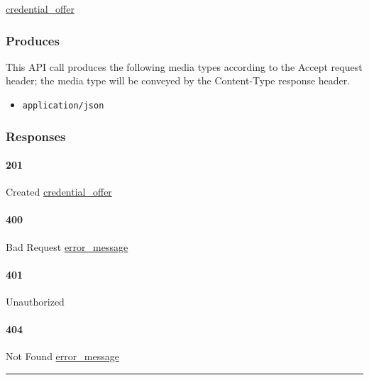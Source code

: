 \protect\hyperlink{credential_offer}{credential\_offer}

\hypertarget{produces-38}{%
\subsubsection{Produces}\label{produces-38}}

This API call produces the following media types according to the
{Accept} request header; the media type will be conveyed by the
{Content-Type} response header.

\begin{itemize}
\tightlist
\item
  \texttt{application/json}
\end{itemize}

\hypertarget{responses-38}{%
\subsubsection{Responses}\label{responses-38}}

\hypertarget{section-127}{%
\paragraph{201}\label{section-127}}

Created \protect\hyperlink{credential_offer}{credential\_offer}

\hypertarget{section-128}{%
\paragraph{400}\label{section-128}}

Bad Request \protect\hyperlink{error_message}{error\_message}

\hypertarget{section-129}{%
\paragraph{401}\label{section-129}}

Unauthorized \protect\hyperlink{}{}

\hypertarget{section-130}{%
\paragraph{404}\label{section-130}}

Not Found \protect\hyperlink{error_message}{error\_message}

\begin{center}\rule{0.5\linewidth}{\linethickness}\end{center}

